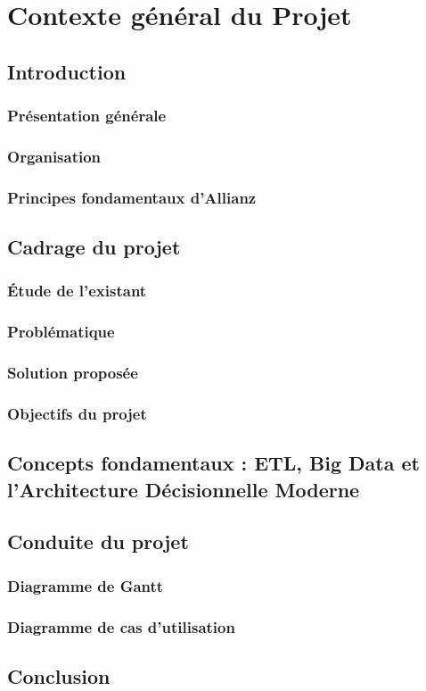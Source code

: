 \chapter{Contexte général du Projet}

\section*{Introduction}



\subsection{Présentation générale}

\subsection{Organisation}


\subsection{Principes fondamentaux d’Allianz}




\section{Cadrage du projet}

\subsection{Étude de l'existant}

\subsection{Problématique}

\subsection{Solution proposée}


\subsection{Objectifs du projet}

\section{Concepts fondamentaux : ETL, Big Data et l’Architecture Décisionnelle Moderne}


\section{Conduite du projet}


\subsection{Diagramme de Gantt}


\subsection{Diagramme de cas d'utilisation}


\section{Conclusion}

\newpage